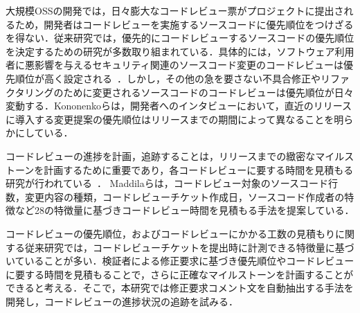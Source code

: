 \documentclass[T,J]{fose} %
\begin{document}

大規模OSSの開発では，日々膨大なコードレビュー票がプロジェクトに提出されるため，開発者はコードレビューを実施するソースコードに優先順位をつけざるを得ない．従来研究では，優先的にコードレビューするソースコードの優先順位を決定するための研究が多数取り組まれている．具体的には，ソフトウェア利用者に悪影響を与えるセキュリティ関連のソースコード変更のコードレビューは優先順位が高く設定される~\cite{integrator}\cite{review_prioritize_pineapple}．しかし，その他の急を要さない不具合修正やリファクタリングのために変更されるソースコードのコードレビューは優先順位が日々変動する．Kononenkoらは，開発者へのインタビューにおいて，直近のリリースに導入する変更提案の優先順位はリリースまでの期間によって異なることを明らかにしている\cite{release_merge}．

コードレビューの進捗を計画，追跡することは，リリースまでの緻密なマイルストーンを計画するために重要であり，各コードレビューに要する時間を見積もる研究が行われている~\cite{estimate_time1}\cite{estimate_time2}\cite{estimate_time3}\cite{estimate_time4}\cite{estimate_time5}．
Maddilaらは，コードレビュー対象のソースコード行数，変更内容の種類，コードレビューチケット作成日，ソースコード作成者の特徴など28の特徴量に基づきコードレビュー時間を見積もる手法を提案している\cite{estimate_time2}．

コードレビューの優先順位，およびコードレビューにかかる工数の見積もりに関する従来研究では，コードレビューチケットを提出時に計測できる特徴量に基づいていることが多い．検証者による修正要求に基づき優先順位やコードレビューに要する時間を見積もることで，さらに正確なマイルストーンを計画することができると考える．そこで，本研究では修正要求コメント文を自動抽出する手法を開発し，コードレビューの進捗状況の追跡を試みる．



\end{document}
